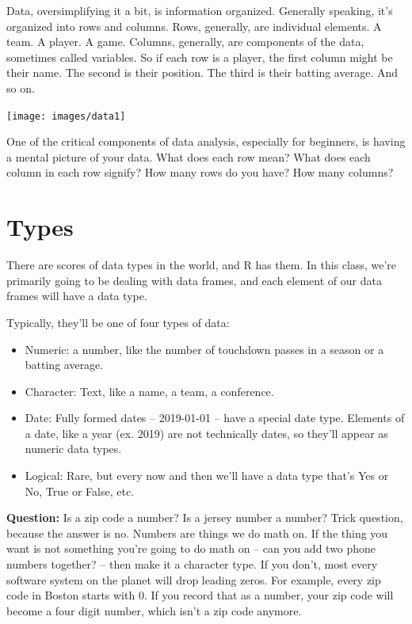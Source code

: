 \documentclass[
]{book}
\providecommand{\tightlist}{%
  \setlength{\itemsep}{0pt}\setlength{\parskip}{0pt}}
\begin{document}
Data, oversimplifying it a bit, is information organized. Generally speaking, it's organized into rows and columns. Rows, generally, are individual elements. A team. A player. A game. Columns, generally, are components of the data, sometimes called variables. So if each row is a player, the first column might be their name. The second is their position. The third is their batting average. And so on.

\texttt{[image: images/data1]}

One of the critical components of data analysis, especially for beginners, is having a mental picture of your data. What does each row mean? What does each column in each row signify? How many rows do you have? How many columns?

\hypertarget{types}{%
\section{Types}\label{types}}

There are scores of data types in the world, and R has them. In this class, we're primarily going to be dealing with data frames, and each element of our data frames will have a data type.

Typically, they'll be one of four types of data:

\begin{itemize}
\tightlist
\item
  Numeric: a number, like the number of touchdown passes in a season or a batting average.
\item
  Character: Text, like a name, a team, a conference.
\item
  Date: Fully formed dates -- 2019-01-01 -- have a special date type. Elements of a date, like a year (ex. 2019) are not technically dates, so they'll appear as numeric data types.
\item
  Logical: Rare, but every now and then we'll have a data type that's Yes or No, True or False, etc.
\end{itemize}

\textbf{Question:} Is a zip code a number? Is a jersey number a number? Trick question, because the answer is no. Numbers are things we do math on. If the thing you want is not something you're going to do math on -- can you add two phone numbers together? -- then make it a character type. If you don't, most every software system on the planet will drop leading zeros. For example, every zip code in Boston starts with 0. If you record that as a number, your zip code will become a four digit number, which isn't a zip code anymore.
\end{document}
